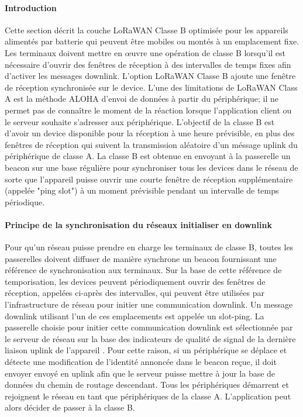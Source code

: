 \documentclass[11pt]{article}
\begin{document}
\paragraph{Introduction}
Cette section décrit la couche LoRaWAN Classe B optimisée pour les appareils alimentés par batterie qui peuvent être mobiles ou montés à un emplacement fixe.
Les terminaux doivent mettre en œuvre une opération de classe B lorsqu'il est nécessaire d'ouvrir des fenêtres de réception à des intervalles de temps fixes afin d'activer les messages downlink. L'option LoRaWAN Classe B ajoute une fenêtre de réception synchronisée sur le device. L'une des limitations de LoRaWAN Class A est la méthode ALOHA d'envoi de données à partir du périphérique; il ne permet pas de connaître le moment de la réaction lorsque l'application client ou le serveur souhaite s'adresser aux périphérique. L'objectif de la classe B est d'avoir un device disponible pour la réception à une heure prévisible, en plus des fenêtres de réception qui suivent la transmission aléatoire d'un méssage uplink du périphérique de classe A. La classe B est obtenue en envoyant à la passerelle un beacon sur une base régulière pour synchroniser tous les devices dans le réseau de sorte que l'appareil puisse ouvrir une courte fenêtre de réception supplémentaire (appelée "ping slot") à un moment prévisible pendant un intervalle de temps périodique.

\paragraph{Principe de la synchronisation du réseaux initialiser en downlink}
Pour qu'un réseau puisse prendre en charge les terminaux de classe B, toutes les passerelles doivent diffuser de manière synchrone un beacon fournissant une référence de synchronisation aux terminaux. Sur la base de cette référence de temporisation, les devices peuvent périodiquement ouvrir des fenêtres de réception, appelées ci-après des intervalles, qui peuvent être utilisées par l'infrastructure de réseau pour initier une communication downlink. Un message downlink utilisant l'un de ces emplacements est appelée un slot-ping. La passerelle choisie pour initier cette communication downlink est sélectionnée par le serveur de réseau sur la base des indicateurs de qualité de signal de la dernière liaison uplink de l'appareil . Pour cette raison, si un périphérique se déplace et détecte une modification de l'identité annoncée dans le beacon reçue, il doit envoyer envoyé en uplink afin que le serveur puisse mettre à jour la base de données du chemin de routage descendant.
Tous les périphériques démarrent et rejoignent le réseau en tant que périphériques de la classe A. L'application peut alors décider de passer à la classe B.
\end{document}
